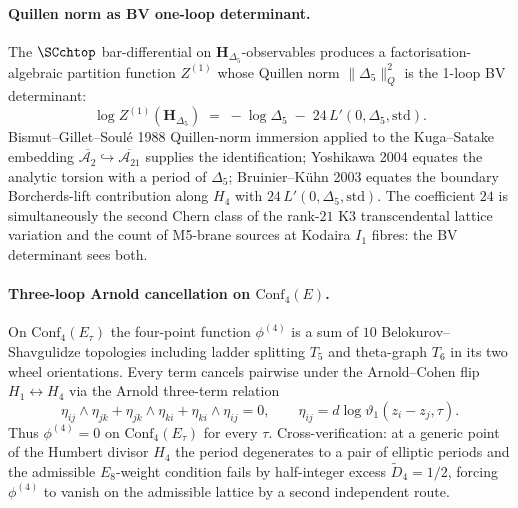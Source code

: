 \paragraph{Quillen norm as BV one-loop determinant.}
The $\SCchtop$ bar-differential on $\mathbf{H}_{\Delta_5}$-observables
produces a factorisation-algebraic partition function $Z^{(1)}$ whose
Quillen norm $\|\Delta_5\|_Q^2$ is the 1-loop BV determinant:
\[
\log Z^{(1)}(\mathbf{H}_{\Delta_5})
\;=\;
-\log\Delta_5
\;-\;
24\,L'(0,\Delta_5,\mathrm{std}).
\]
Bismut--Gillet--Soulé 1988 Quillen-norm immersion applied to the
Kuga--Satake embedding
$\overline{\mathcal{A}_2}\hookrightarrow\overline{\mathcal{A}_{21}}$
supplies the identification; Yoshikawa 2004 equates the analytic
torsion with a period of $\Delta_5$; Bruinier--Kühn 2003 equates the
boundary Borcherds-lift contribution along $H_4$ with
$24\,L'(0,\Delta_5,\mathrm{std})$. The coefficient $24$ is
simultaneously the second Chern class of the rank-$21$ K3
transcendental lattice variation and the count of M5-brane sources at
Kodaira $I_1$ fibres: the BV determinant sees both.

\paragraph{Three-loop Arnold cancellation on $\mathrm{Conf}_4(E)$.}
On $\mathrm{Conf}_4(E_\tau)$ the four-point function $\phi^{(4)}$ is a
sum of $10$ Belokurov--Shavgulidze topologies including ladder
splitting $T_5$ and theta-graph $T_6$ in its two wheel orientations.
Every term cancels pairwise under the Arnold--Cohen flip
$H_1 \leftrightarrow H_4$ via the Arnold three-term relation
\[
\eta_{ij}\wedge\eta_{jk}
+
\eta_{jk}\wedge\eta_{ki}
+
\eta_{ki}\wedge\eta_{ij}
=
0,
\qquad
\eta_{ij} = d\log\vartheta_1(z_i-z_j,\tau).
\]
Thus $\phi^{(4)} = 0$ on $\mathrm{Conf}_4(E_\tau)$ for every $\tau$.
Cross-verification: at a generic point of the Humbert divisor $H_4$ the
period degenerates to a pair of elliptic periods and the admissible
$E_8$-weight condition fails by half-integer excess
$\widetilde{D}_4 = 1/2$, forcing $\phi^{(4)}$ to vanish on the
admissible lattice by a second independent route.

